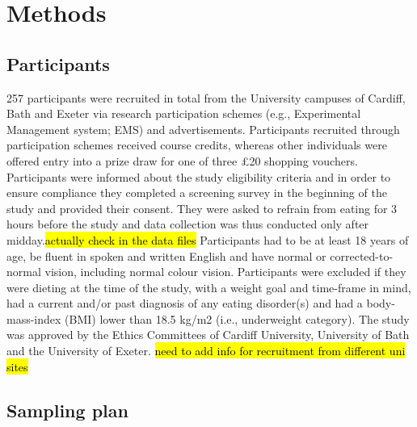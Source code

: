 \documentclass[man,floatsintext]{apa6}
\begin{document}
\section{Methods}\label{methods}

\subsection{Participants}\label{participants}

\par

257 participants were recruited in total from the University campuses of
Cardiff, Bath and Exeter via research participation schemes (e.g.,
Experimental Management system; EMS) and advertisements. Participants
recruited through participation schemes received course credits, whereas
other individuals were offered entry into a prize draw for one of three
£20 shopping vouchers. Participants were informed about the study
eligibility criteria and in order to ensure compliance they completed a
screening survey in the beginning of the study and provided their
consent. They were asked to refrain from eating for 3 hours before the
study and data collection was thus conducted only after
midday.\hl{actually check in the data files} Participants had to be at
least 18 years of age, be fluent in spoken and written English and have
normal or corrected-to-normal vision, including normal colour vision.
Participants were excluded if they were dieting at the time of the
study, with a weight goal and time-frame in mind, had a current and/or
past diagnosis of any eating disorder(s) and had a body-mass-index (BMI)
lower than 18.5 kg/m2 (i.e., underweight category). The study was
approved by the Ethics Committees of Cardiff University, University of
Bath and the University of Exeter.
\hl{need to add info for recruitment from different uni sites}

\subsection{Sampling plan}\label{sampling}

\par
\end{document}
